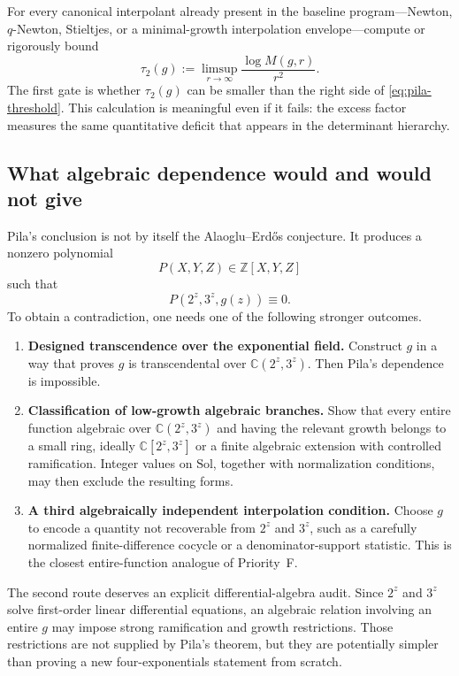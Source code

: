 \documentclass[10pt,letterpaper]{article}
\newcommand{\Z}{\mathbb Z}
\newcommand{\C}{\mathbb C}
\newcommand{\Sol}{\mathrm{Sol}}
\begin{document}
\begin{takeawaybox}
For every canonical interpolant already present in the baseline program---Newton,
\(q\)-Newton, Stieltjes, or a minimal-growth interpolation envelope---compute or rigorously
bound
\[
  \tau_2(g):=\limsup_{r\to\infty}\frac{\log M(g,r)}{r^2}.
\]
The first gate is whether \(\tau_2(g)\) can be smaller than the right side of
\cref{eq:pila-threshold}.  This calculation is meaningful even if it fails: the excess
factor measures the same quantitative deficit that appears in the determinant hierarchy.
\end{takeawaybox}

\subsection{What algebraic dependence would and would not give}

Pila's conclusion is not by itself the Alaoglu--Erd\H{o}s conjecture.  It produces a
nonzero polynomial
\[
  P(X,Y,Z)\in\Z[X,Y,Z]
\]
such that
\[
  P(2^z,3^z,g(z))\equiv0.
\]
To obtain a contradiction, one needs one of the following stronger outcomes.

\begin{enumerate}
\item \textbf{Designed transcendence over the exponential field.}
Construct \(g\) in a way that proves \(g\) is transcendental over
\(\C(2^z,3^z)\).  Then Pila's dependence is impossible.

\item \textbf{Classification of low-growth algebraic branches.}
Show that every entire function algebraic over \(\C(2^z,3^z)\) and having the relevant
growth belongs to a small ring, ideally \(\C[2^z,3^z]\) or a finite algebraic extension with
controlled ramification.  Integer values on \(\Sol\), together with normalization conditions,
may then exclude the resulting forms.

\item \textbf{A third algebraically independent interpolation condition.}
Choose \(g\) to encode a quantity not recoverable from \(2^z\) and \(3^z\), such as a
carefully normalized finite-difference cocycle or a denominator-support statistic.  This is
the closest entire-function analogue of Priority~F.
\end{enumerate}

The second route deserves an explicit differential-algebra audit.  Since \(2^z\) and
\(3^z\) solve first-order linear differential equations, an algebraic relation involving an
entire \(g\) may impose strong ramification and growth restrictions.  Those restrictions are
not supplied by Pila's theorem, but they are potentially simpler than proving a new
four-exponentials statement from scratch.
\end{document}
